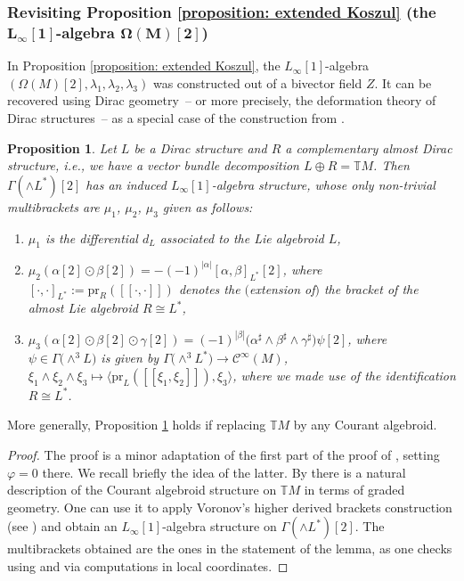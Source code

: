 \documentclass[pdftex]{sigma}
\numberwithin{equation}{section}
\newtheorem{Proposition}[Theorem]{Proposition}
 { \theoremstyle{definition}
\newtheorem{Definition}[Theorem]{Definition}
\newtheorem{Remark}[Theorem]{Remark} }
\newcommand{\smooth}{\mathcal{C}}
\newcommand{\TT}{\ensuremath{\mathbb T}}
\newcommand{\oo}{[\![}
\newcommand{\cc}{]\!]}
\begin{document}
\subsubsection[Revisiting Proposition \ref{proposition: extended Koszul} (the {$L_\infty[1]$}-algebra {$\Omega(M)[2]$})]{Revisiting Proposition \ref{proposition: extended Koszul} (the $\boldsymbol{L_\infty[1]}$-algebra $\boldsymbol{\Omega(M)[2]}$)}
In Proposition \ref{proposition: extended Koszul}, the $L_\infty[1]$-algebra $(\Omega(M)[2],\lambda_1,\lambda_2,\lambda_3)$ was constructed out of a bivector field $Z$. It can be recovered using Dirac geometry~-- or more precisely, the deformation theory of Dirac structures~-- as a special case of the construction from \cite[Section~2.2]{FZgeo}.

\begin{Proposition}\label{lem:2.6first} Let $L$ be a Dirac structure and $R$ a complementary almost Dirac structure, i.e., we have a vector bundle decomposition $L\oplus R=\TT M$. Then $\Gamma(\wedge L^*)[2]$ has an induced $L_{\infty}[1]$-algebra structure, whose only non-trivial multibrackets are $\mu_1$, $\mu_2$, $\mu_3$ given as follows:
\begin{enumerate}\itemsep=0pt
\item[$1)$] $\mu_1$ is the differential $d_L$ associated to the Lie algebroid $L$,
\item[$2)$] $\mu_2(\alpha[2] \odot \beta[2])=-(-1)^{|\alpha|}[\alpha,\beta]_{L^*}[2]$, where $[\cdot,\cdot]_{L^*}:=\mathrm{pr}_{R}(\oo \cdot , \cdot \cc)$ denotes the $($extension of$)$ the bracket of the almost Lie algebroid $R\cong L^*$,
\item[$3)$] $\mu_3(\alpha[2]\odot \beta[2]\odot \gamma[2])=(-1)^{|\beta|} \big(\alpha^\sharp\wedge \beta^\sharp \wedge \gamma^\sharp\big) \psi[2]$, where $\psi\in \Gamma\big({\wedge}^3 L\big)$ is given by $\Gamma\big({\wedge}^3 L^*\big)\to \smooth^\infty(M)$, $\xi_1 \wedge \xi_2\wedge \xi_3 \mapsto \langle \mathrm{pr}_{L}(\oo \xi_1 , \xi_2 \cc), \xi_3\rangle$, where we made use of the identification $R \cong L^*$.
\end{enumerate}
\end{Proposition}

More generally, Proposition \ref{lem:2.6first} holds if replacing $\TT M$ by any Courant algebroid.

\begin{proof}The proof is a minor adaptation of the first part of the proof of \cite[Lemma 2.6]{FZgeo}, setting $\varphi=0$ there. We recall briefly the idea of the latter. By \cite{DimaThesis} there is a natural description of the Courant algebroid structure on $\TT M$ in terms of graded geometry. One can use it to apply Voronov's higher derived brackets construction (see \cite{Voronov1,Voronov2}) and obtain an $L_{\infty}[1]$-algebra structure on $\Gamma(\wedge L^*)[2]$. The multibrackets obtained are the ones in the statement of the lemma, as one checks using \cite{DimaThesis} and via computations in local coordinates.
\end{proof}
\end{document}

